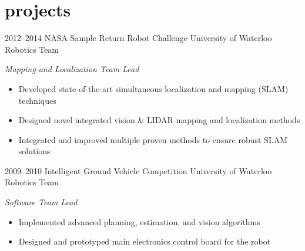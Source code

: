 \documentclass[stdletter]{friggeri-cv} %
\begin{document}
\vspace{-3mm}
\section{projects}

\begin{entrylist}
    \entry
    {2012--2014}
    {NASA Sample Return Robot Challenge}
    {University of Waterloo Robotics Team}
    {\emph{Mapping and Localization Team Lead}
    \begin{itemize} 
        \item Developed state-of-the-art simultaneous localization and mapping (SLAM) techniques
        \item Designed novel integrated vision \& LIDAR mapping and localization methods
        \item Integrated and improved multiple proven methods to ensure robust SLAM solutions
    \end{itemize} 
    }
    \entry
    {2009--2010}
    {Intelligent Ground Vehicle Competition}
    {University of Waterloo Robotics Team}
    {\emph{Software Team Lead}
    \begin{itemize}
        \item Implemented advanced planning, estimation, and vision algorithms
        \item Designed and prototyped main electronics control board for the robot
    \end{itemize} 
    }
\end{entrylist}
\end{document}
